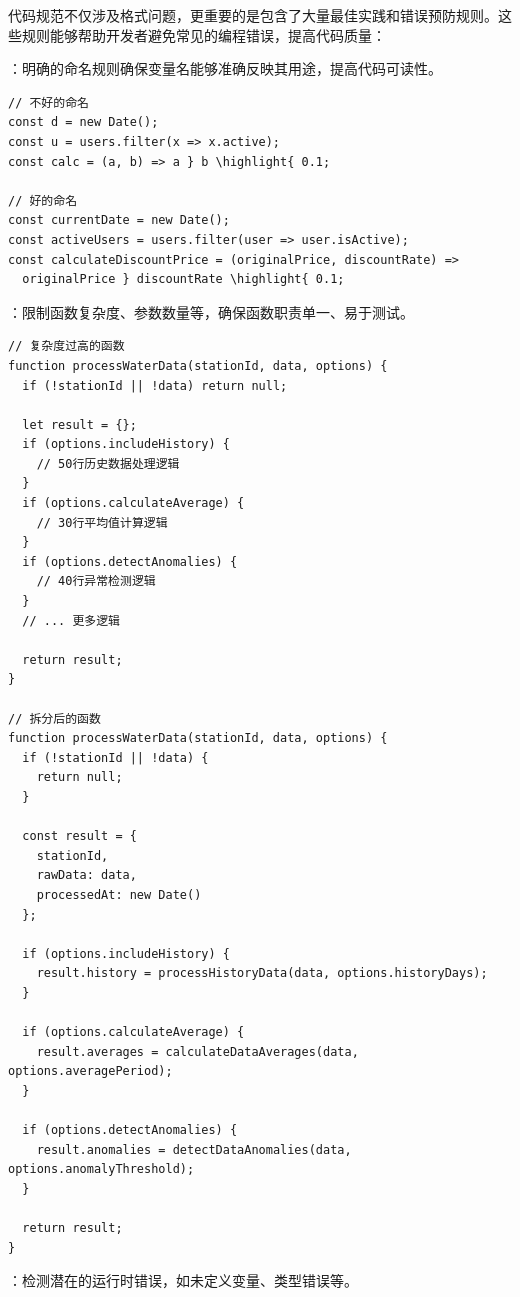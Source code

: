 
代码规范不仅涉及格式问题，更重要的是包含了大量最佳实践和错误预防规则。这些规则能够帮助开发者避免常见的编程错误，提高代码质量：

：明确的命名规则确保变量名能够准确反映其用途，提高代码可读性。

\begin{lstlisting}[style=javascript]
// 不好的命名
const d = new Date();
const u = users.filter(x => x.active);
const calc = (a, b) => a } b \highlight{ 0.1;

// 好的命名
const currentDate = new Date();
const activeUsers = users.filter(user => user.isActive);
const calculateDiscountPrice = (originalPrice, discountRate) => 
  originalPrice } discountRate \highlight{ 0.1;
\end{lstlisting}

：限制函数复杂度、参数数量等，确保函数职责单一、易于测试。

\begin{lstlisting}[style=javascript]
// 复杂度过高的函数
function processWaterData(stationId, data, options) {
  if (!stationId || !data) return null;
  
  let result = {};
  if (options.includeHistory) {
    // 50行历史数据处理逻辑
  }
  if (options.calculateAverage) {
    // 30行平均值计算逻辑
  }
  if (options.detectAnomalies) {
    // 40行异常检测逻辑
  }
  // ... 更多逻辑
  
  return result;
}

// 拆分后的函数
function processWaterData(stationId, data, options) {
  if (!stationId || !data) {
    return null;
  }
  
  const result = {
    stationId,
    rawData: data,
    processedAt: new Date()
  };
  
  if (options.includeHistory) {
    result.history = processHistoryData(data, options.historyDays);
  }
  
  if (options.calculateAverage) {
    result.averages = calculateDataAverages(data, options.averagePeriod);
  }
  
  if (options.detectAnomalies) {
    result.anomalies = detectDataAnomalies(data, options.anomalyThreshold);
  }
  
  return result;
}
\end{lstlisting}

：检测潜在的运行时错误，如未定义变量、类型错误等。

